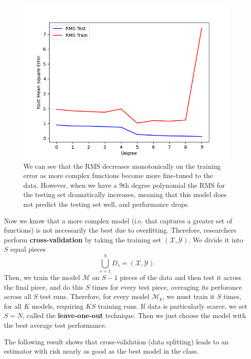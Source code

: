   \begin{figure}[H]
    \centering
    \includegraphics[scale=0.4]{img/Degree_vs_RMS.png}
    \caption{We can see that the RMS decreases monotonically on the training error as more complex functions become more fine-tuned to the data. However, when we have a $9$th degree polynomial the RMS for the testing set dramatically increases, meaning that this model does not predict the testing set well, and performance drops. }
    \label{fig:poly_deg_vs_rms}
  \end{figure}

  Now we know that a more complex model (i.e. that captures a greater set of functions) is not necessarily the best due to overfitting. Therefore, researchers perform \textbf{cross-validation} by taking the training set $(\mathcal{X}, \mathcal{Y})$. We divide it into $S$ equal pieces 
  \begin{equation}
    \bigcup_{s=1}^S D_s = (\mathcal{X}, \mathcal{Y})
  \end{equation}
  Then, we train the model $\mathcal{M}$ on $S-1$ pieces of the data and then test it across the final piece, and do this $S$ times for every test piece, averaging its perforance across all $S$ test runs. Therefore, for every model $\mathcal{M}_k$, we must train it $S$ times, for all $K$ models, requiring $KS$ training runs. If data is particularly scarce, we set $S = N$, called the \textbf{leave-one-out} technique. Then we just choose the model with the best average test performance. 

  The following result shows that cross-validation (data splitting) leads to an estimator with risk nearly as good as the best model in the class. 


